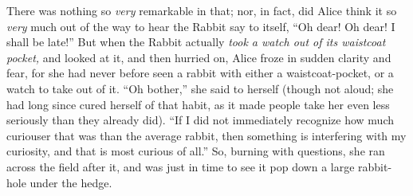 There was nothing so \emph{very} remarkable in that; nor, in fact, did Alice think it so \emph{very} much out of the way to hear the Rabbit say to itself, “Oh dear! Oh dear! I shall be late!” But when the Rabbit actually \emph{took a watch out of its waistcoat pocket,} and looked at it, and then hurried on, Alice froze in sudden clarity and fear, for she had never before seen a rabbit with either a waistcoat-pocket, or a watch to take out of it. “Oh bother,” she said to herself (though not aloud; she had long since cured herself of that habit, as it made people take her even less seriously than they already did). “If I did not immediately recognize how much curiouser that was than the average rabbit, then something is interfering with my curiosity, and that is most curious of all.” So, burning with questions, she ran across the field after it, and was just in time to see it pop down a large rabbit-hole under the hedge.


